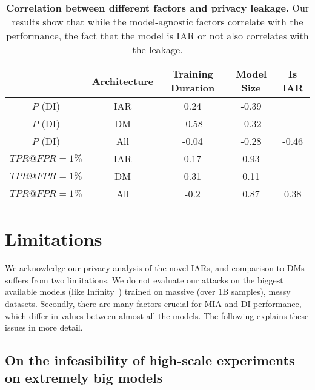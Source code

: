 \begin{table}[]
    \scriptsize
    \caption{{\textbf{Correlation between different factors and privacy leakage.} Our results show that while the model-agnostic factors correlate with the performance, the fact that the model is IAR or not also correlates with the leakage.}}
    \centering
    \begin{tabular}{ccccc}
        \toprule
        & Architecture & Training Duration & Model Size & Is IAR \\ 
         \midrule
        {$P$ (DI)} & IAR & 0.24 & -0.39 &  \\ 
        {$P$ (DI)} & DM & -0.58 & -0.32 &  \\ 
        {$P$ (DI)} & All & -0.04 & -0.28 & -0.46 \\ 
        \midrule
         {$TPR@FPR=1\%$}& IAR & 0.17 & 0.93 &  \\ 
         {$TPR@FPR=1\%$}& DM & 0.31 & 0.11 &  \\ 
         {$TPR@FPR=1\%$} & All & -0.2 & 0.87 & 0.38 \\ 
        \bottomrule
    \end{tabular}
    \label{tab:factors_correlation}
\end{table}

\section{Limitations}
\label{app:limitations}

{We acknowledge our privacy analysis of the novel IARs, and comparison to DMs suffers from two limitations. We do not evaluate our attacks on the biggest available models (like Infinity~\citep{han2024infinityscalingbitwiseautoregressive}) trained on massive (over 1B samples), messy datasets. Secondly, there are many factors crucial for MIA and DI performance, which differ in values between almost all the models. The following explains these issues in more detail.}

\subsection{On the infeasibility of high-scale experiments on extremely big models}


